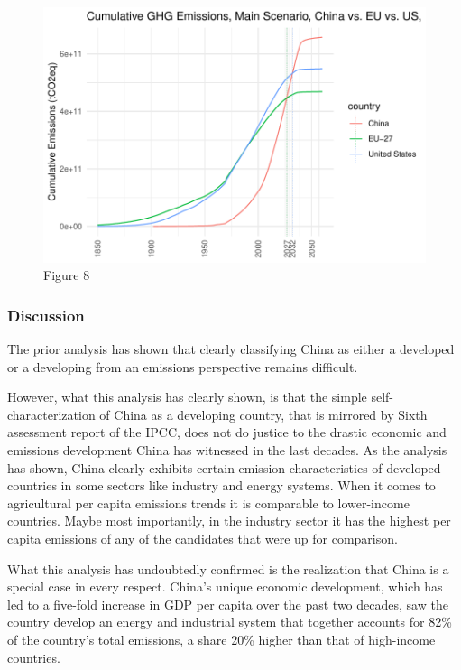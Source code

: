 \documentclass[
  12pt,
]{article}
\numberwithin{equation}{section}
\numberwithin{table}{section}
\numberwithin{figure}{section}
\begin{document}
\begin{figure}
\centering
\includegraphics{Paper_files/figure-latex/unnamed-chunk-8-1.pdf}
\caption{Figure 8}
\end{figure}

\hypertarget{discussion}{%
\subsubsection{Discussion}\label{discussion}}

The prior analysis has shown that clearly classifying China as either a
developed or a developing from an emissions perspective remains
difficult.

However, what this analysis has clearly shown, is that the simple
self-characterization of China as a developing country, that is mirrored
by Sixth assessment report of the IPCC, does not do justice to the
drastic economic and emissions development China has witnessed in the
last decades. As the analysis has shown, China clearly exhibits certain
emission characteristics of developed countries in some sectors like
industry and energy systems. When it comes to agricultural per capita
emissions trends it is comparable to lower-income countries. Maybe most
importantly, in the industry sector it has the highest per capita
emissions of any of the candidates that were up for comparison.

What this analysis has undoubtedly confirmed is the realization that
China is a special case in every respect. China's unique economic
development, which has led to a five-fold increase in GDP per capita
over the past two decades, saw the country develop an energy and
industrial system that together accounts for 82\% of the country's total
emissions, a share 20\% higher than that of high-income countries.
\end{document}
